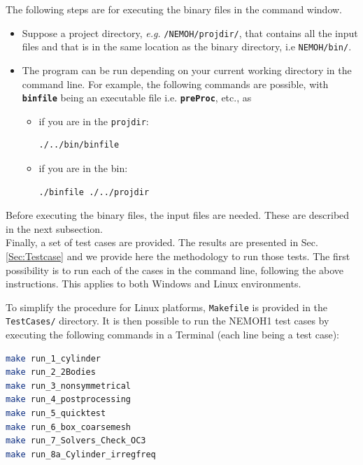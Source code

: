 \documentclass[12pt,a4paper,titlepage]{article}
\begin{document}
The following steps are for executing the binary files in the command window.
\begin{itemize}
\item Suppose a project directory, \emph{e.g.} \texttt{/NEMOH/projdir/}, that contains all the input files and that is in the same location as the binary directory, i.e \texttt{NEMOH/bin/}.
\item The program can be run depending on your current working directory in the command line. For example, the following commands are possible, with \texttt{\textbf{binfile}} being an executable file i.e. \texttt{\textbf{preProc}}, etc., as
\begin{itemize}
\item if you are in the \texttt{projdir}:
\begin{lstlisting}[language=bash,keywordstyle=\color{blue},basicstyle=\ttfamily\footnotesize,backgroundcolor=\color{lightgray}]
    ./../bin/binfile
\end{lstlisting}
\item if you are in the {bin}:
\begin{lstlisting}[language=bash,keywordstyle=\color{blue},basicstyle=\ttfamily\footnotesize,backgroundcolor=\color{lightgray}]
    ./binfile ./../projdir
\end{lstlisting}
\end{itemize}
\end{itemize}

Before executing the binary files, the input files are needed. These are described in the next subsection.\\

Finally, a set of test cases are provided. The results are presented in Sec. \ref{Sec:Testcase} and we provide here the methodology to run those tests. The first possibility is to run each of the cases in the command line, following the above instructions. This applies to both Windows and Linux environments.

To simplify the procedure for Linux platforms, \texttt{Makefile} is provided in the \texttt{TestCases/} directory. It is then possible to run the NEMOH1 test cases by executing the following commands in a Terminal (each line being a test case):
\begin{lstlisting}[language=bash,keywordstyle=\color{blue},basicstyle=\ttfamily\footnotesize,backgroundcolor=\color{lightgray}]
make run_1_cylinder
make run_2_2Bodies
make run_3_nonsymmetrical
make run_4_postprocessing
make run_5_quicktest
make run_6_box_coarsemesh
make run_7_Solvers_Check_OC3
make run_8a_Cylinder_irregfreq
\end{lstlisting}
\end{document}
